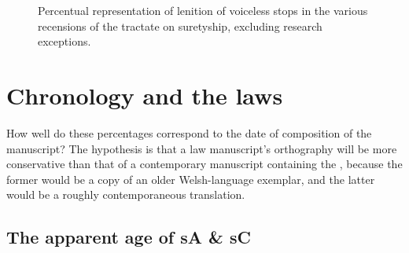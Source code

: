   \begin{figure}[h]
    \centering
    \caption{Percentual representation of lenition of voiceless stops in the various recensions of the tractate on suretyship, excluding research exceptions.}
    \label{fig:barchartlaws}
  \end{figure}

\section{Chronology and the laws}
\label{sec:chronology-laws}


How well do these percentages correspond to the date of composition of the manuscript? The hypothesis is that a law manuscript's orthography will be more conservative than that of a contemporary manuscript containing the , because the former would be a copy of an older Welsh-language exemplar, and the latter would be a roughly contemporaneous translation.

\subsection{The apparent age of \gls{sA} \& \gls{sC}}
\label{sec:glsa--glsc}


